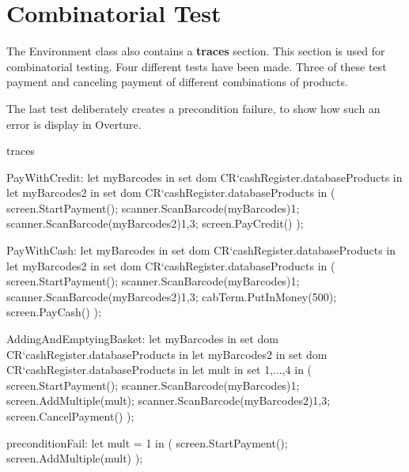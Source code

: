 \section{Combinatorial Test}
The Environment class also contains a \textbf{traces} section. This section is used for combinatorial testing. Four different tests have been made. Three of these test payment and canceling payment of different combinations of products. 

The last test deliberately creates a precondition failure, to show how such an error is display in Overture. 

\begin{vdmpp}

traces

PayWithCredit: 
 let myBarcodes in set dom CR`cashRegister.databaseProducts
 in
  let myBarcodes2 in set dom CR`cashRegister.databaseProducts
  in
  (
   screen.StartPayment();
   scanner.ScanBarcode(myBarcodes){1};
   scanner.ScanBarcode(myBarcodes2){1,3};
   screen.PayCredit()
  );


PayWithCash: 
 let myBarcodes in set dom CR`cashRegister.databaseProducts
 in
  let myBarcodes2 in set dom CR`cashRegister.databaseProducts
  in
  (
   screen.StartPayment();
   scanner.ScanBarcode(myBarcodes){1};
   scanner.ScanBarcode(myBarcodes2){1,3};
   cabTerm.PutInMoney(500);
   screen.PayCash()
  );
       
AddingAndEmptyingBasket: 
 let myBarcodes in set dom CR`cashRegister.databaseProducts
 in
  let myBarcodes2 in set dom CR`cashRegister.databaseProducts
  in
   let mult in set {1,...,4}
   in
   (
    screen.StartPayment();
    scanner.ScanBarcode(myBarcodes){1};
    screen.AddMultiple(mult);
    scanner.ScanBarcode(myBarcodes2){1,3};
    screen.CancelPayment()
   );
   
preconditionFail:
 let mult = 1
  in
  (
   screen.StartPayment();
   screen.AddMultiple(mult)
  );
\end{vdmpp}

